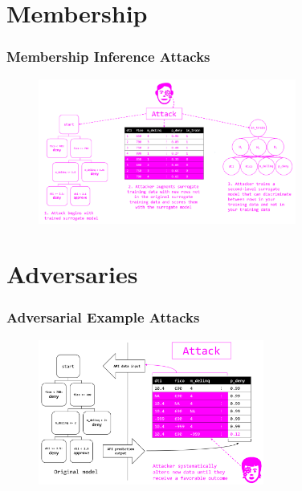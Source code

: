 \documentclass[11pt,
               aspectratio=169,
               hyperref={colorlinks}
               ]{beamer}
\begin{document}
	\section{Membership}
	
		\begin{frame}
		
			\frametitle{Membership Inference Attacks}		
			
			\begin{figure}[htb]
				\begin{center}
					\includegraphics[height=135pt]{img/membership.PNG}
				\end{center}
			\end{figure}	

		
		\end{frame}
	
	\section{Adversaries}
	
		\begin{frame}
		
			\frametitle{Adversarial Example Attacks}		
			
			\begin{figure}[htb]
				\begin{center}
					\includegraphics[height=135pt]{img/adversary.PNG}
				\end{center}
			\end{figure}	

		
		\end{frame}	
\end{document}
